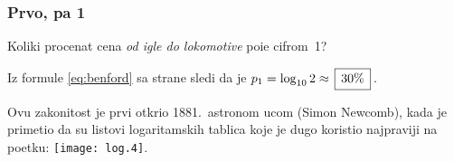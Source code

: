 \subsubsection{Prvo, pa 1}

\def\fibonacci#1#2#3{%
\newcount\o \o=#1
\newcount\t \t=#2
\number\o,~\number\t
\newcount\f
\newcount\n \n=#3 \advance\n-2
\loop
  \f=\t \advance\t\o \o=\f
  , \number\t
  \advance \n -1
\ifnum \n>0 \repeat}

\zadatak 
Koliki procenat cena {\sl od igle do lokomotive\/}
po{\cv}i{\nj}e cifrom~1?

\resenje Iz formule \eqref{eq:benford} sa strane \pageref{eq:benford} sledi da je $p_1=\logten 2 \approx \ram{30\%}$.

\dodatak Ovu zakonitost je prvi otkrio 1881.\ astronom {\Nj}ucom (Simon Newcomb), kada je primetio da su
listovi logaritamskih tablica koje je dugo koristio najpr{\lj}aviji
na po{\cv}etku: \texttt{[image: log.4]}.
